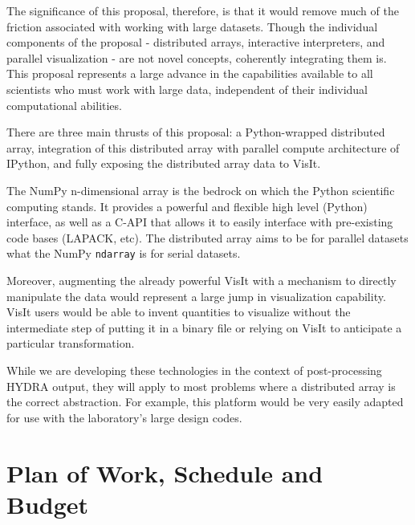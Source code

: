 \documentclass[letterpaper,11pt]{article}
\begin{document}
The significance of this proposal, therefore, is that it would remove much of the friction 
associated with working with large datasets.  Though the individual components of the 
proposal - distributed arrays, interactive interpreters, and parallel visualization - are 
not novel concepts, coherently integrating them is.  This proposal represents a large 
advance in the capabilities available to all scientists who must work with large data, 
independent of their individual computational abilities.

There are three main thrusts of this proposal: a Python-wrapped distributed array, integration 
of this distributed array with parallel compute architecture of IPython, and fully exposing 
the distributed array data to VisIt.  

The NumPy n-dimensional array is the bedrock on which the Python scientific computing stands.  
It provides a powerful and flexible high level (Python) interface, as well as a C-API that 
allows it to easily interface with pre-existing code bases (LAPACK, etc).  The distributed 
array aims to be for parallel datasets what the NumPy \texttt{ndarray} is for serial datasets.

Moreover, augmenting the already powerful VisIt with a mechanism to directly manipulate the 
data would represent a large jump in visualization capability.  VisIt users would be able 
to invent quantities to visualize without the intermediate step of putting it in a binary 
file or relying on VisIt to anticipate a particular transformation.

While we are developing these technologies in the context of post-processing HYDRA output, 
they will apply to most problems where a distributed array is the correct abstraction.  
For example, this platform would be very easily adapted for use with the laboratory's large 
design codes.




\section*{Plan of Work, Schedule and Budget}
\end{document}
